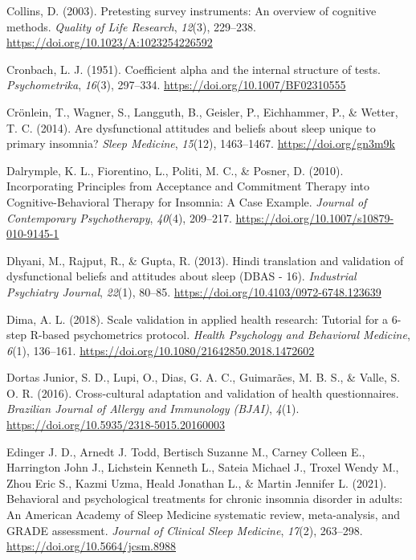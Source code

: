 \documentclass[
  ,doc,11pt, twoside,floatsintext]{apa6}
\newlength{\cslhangindent}
\newlength{\cslentryspacingunit} %
\newenvironment{CSLReferences}[2] %
 {%
  \setlength{\parindent}{0pt}
  \ifodd #1
  \let\oldpar\par
  \def\par{\hangindent=\cslhangindent\oldpar}
  \fi
  \setlength{\parskip}{#2\cslentryspacingunit}
 }%
 {}
\begin{document}
\begin{CSLReferences}{1}{0}
\leavevmode{}%
Collins, D. (2003). Pretesting survey instruments: {An} overview of cognitive methods. \emph{Quality of Life Research}, \emph{12}(3), 229--238. \url{https://doi.org/10.1023/A:1023254226592}

\leavevmode{}%
Cronbach, L. J. (1951). Coefficient alpha and the internal structure of tests. \emph{Psychometrika}, \emph{16}(3), 297--334. \url{https://doi.org/10.1007/BF02310555}

\leavevmode{}%
Crönlein, T., Wagner, S., Langguth, B., Geisler, P., Eichhammer, P., \& Wetter, T. C. (2014). Are dysfunctional attitudes and beliefs about sleep unique to primary insomnia? \emph{Sleep Medicine}, \emph{15}(12), 1463--1467. \url{https://doi.org/gn3m9k}

\leavevmode{}%
Dalrymple, K. L., Fiorentino, L., Politi, M. C., \& Posner, D. (2010). Incorporating {Principles} from {Acceptance} and {Commitment Therapy} into {Cognitive-Behavioral Therapy} for {Insomnia}: {A Case Example}. \emph{Journal of Contemporary Psychotherapy}, \emph{40}(4), 209--217. \url{https://doi.org/10.1007/s10879-010-9145-1}

\leavevmode{}%
Dhyani, M., Rajput, R., \& Gupta, R. (2013). Hindi translation and validation of dysfunctional beliefs and attitudes about sleep ({DBAS} - 16). \emph{Industrial Psychiatry Journal}, \emph{22}(1), 80--85. \url{https://doi.org/10.4103/0972-6748.123639}

\leavevmode{}%
Dima, A. L. (2018). Scale validation in applied health research: Tutorial for a 6-step {R-based} psychometrics protocol. \emph{Health Psychology and Behavioral Medicine}, \emph{6}(1), 136--161. \url{https://doi.org/10.1080/21642850.2018.1472602}

\leavevmode{}%
Dortas Junior, S. D., Lupi, O., Dias, G. A. C., Guimarães, M. B. S., \& Valle, S. O. R. (2016). {Cross-cultural adaptation and validation of health questionnaires}. \emph{Brazilian Journal of Allergy and Immunology (BJAI)}, \emph{4}(1). \url{https://doi.org/10.5935/2318-5015.20160003}

\leavevmode{}%
Edinger J. D., Arnedt J. Todd, Bertisch Suzanne M., Carney Colleen E., Harrington John J., Lichstein Kenneth L., Sateia Michael J., Troxel Wendy M., Zhou Eric S., Kazmi Uzma, Heald Jonathan L., \& Martin Jennifer L. (2021). Behavioral and psychological treatments for chronic insomnia disorder in adults: An {American Academy} of {Sleep Medicine} systematic review, meta-analysis, and {GRADE} assessment. \emph{Journal of Clinical Sleep Medicine}, \emph{17}(2), 263--298. \url{https://doi.org/10.5664/jcsm.8988}


\end{CSLReferences}
\end{document}
